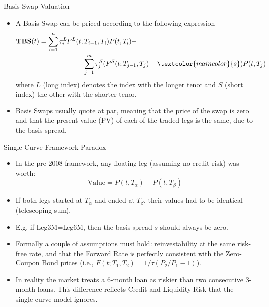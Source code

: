 \documentclass{beamer}
\begin{document}
\begin{frame}{Basis Swap Valuation}
	\begin{itemize}
		\item A Basis Swap can be priced according to the following expression
		\begin{equation}
			\begin{aligned}\textbf{TBS}(t) = \sum_{i=1}^n \tau_i^{L} F^{L}&(t;T_{i-1},T_i)P(t,T_i) - \\
			&-\sum_{j=1}^m \tau_j^{S} (F^{S}(t;T_{j-1},T_j)+\textcolor{maincolor}{s})P(t,T_j)
			\end{aligned}
		\end{equation}
		where $L$ (long index) denotes the index with the longer tenor and $S$ (short index) the other with the shorter tenor.

		\item Basis Swaps usually quote at par, meaning that the price of the swap is zero and that the present value (PV) of each of the traded legs is the same, due to the basis spread.
	\end{itemize}
\end{frame}

\begin{frame}{Single Curve Framework Paradox}
	\begin{itemize}
		\item In the pre-2008 framework, any floating leg (assuming no credit risk) was worth:
		\begin{equation*}
			\text{Value} = P(t, T_\alpha) - P(t, T_\beta)
		\end{equation*}
		\item If both legs started at $T_\alpha$ and ended at $T_\beta$, their values had to be identical (telescoping sum).
		\item E.g. if Leg3M=Leg6M, then the basis spread $s$ should always be zero.
		\item Formally a couple of assumptions must hold: reinvestability at the same risk-free rate, and that the Forward Rate is perfectly consistent with the Zero-Coupon Bond prices (i.e., $F(t;T_1,T_2)=1/\tau(P_2/P_1-1)$).
		\item In reality the market treats a 6-month loan as riskier than two consecutive 3-month loans. This difference reflects Credit and Liquidity Risk that the single-curve model ignores.
	\end{itemize}
\end{frame}
\end{document}
